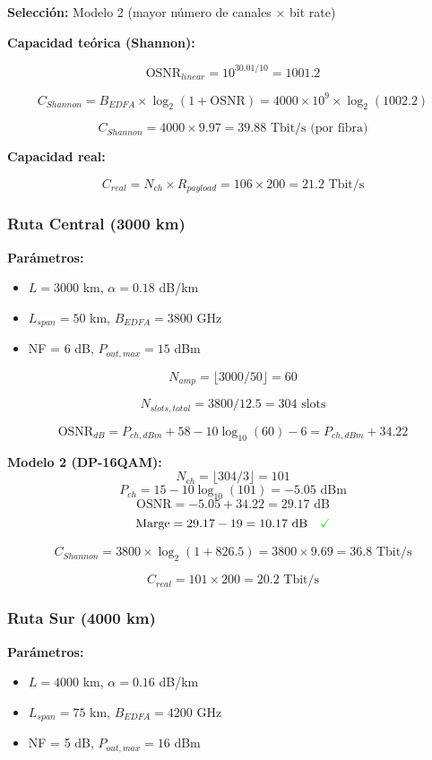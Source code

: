 \documentclass[12pt,a4paper]{extarticle}
\begin{document}
\textbf{Selección:} Modelo 2 (mayor número de canales × bit rate)

\textbf{Capacidad teórica (Shannon):}

$$\text{OSNR}_{linear} = 10^{30.01/10} = 1001.2$$

$$C_{Shannon} = B_{EDFA} \times \log_2(1 + \text{OSNR}) = 4000 \times 10^9 \times \log_2(1002.2)$$

$$C_{Shannon} = 4000 \times 9.97 = 39.88 \text{ Tbit/s (por fibra)}$$

\textbf{Capacidad real:}

$$C_{real} = N_{ch} \times R_{payload} = 106 \times 200 = 21.2 \text{ Tbit/s}$$

\subsubsection*{Ruta Central (3000 km)}

\textbf{Parámetros:}
\begin{itemize}
    \item $L = 3000$ km, $\alpha = 0.18$ dB/km
    \item $L_{span} = 50$ km, $B_{EDFA} = 3800$ GHz
    \item NF = 6 dB, $P_{out,max} = 15$ dBm
\end{itemize}

$$N_{amp} = \lfloor 3000/50 \rfloor = 60$$

$$N_{slots,total} = 3800/12.5 = 304 \text{ slots}$$

$$\text{OSNR}_{dB} = P_{ch,dBm} + 58 - 10\log_{10}(60) - 6 = P_{ch,dBm} + 34.22$$

\textbf{Modelo 2 (DP-16QAM):}
$$N_{ch} = \lfloor 304/3 \rfloor = 101$$
$$P_{ch} = 15 - 10\log_{10}(101) = -5.05 \text{ dBm}$$
$$\text{OSNR} = -5.05 + 34.22 = 29.17 \text{ dB}$$
$$\text{Marge} = 29.17 - 19 = 10.17 \text{ dB} \quad \textcolor{green}{\checkmark}$$

$$C_{Shannon} = 3800 \times \log_2(1 + 826.5) = 3800 \times 9.69 = 36.8 \text{ Tbit/s}$$

$$C_{real} = 101 \times 200 = 20.2 \text{ Tbit/s}$$

\subsubsection*{Ruta Sur (4000 km)}

\textbf{Parámetros:}
\begin{itemize}
    \item $L = 4000$ km, $\alpha = 0.16$ dB/km
    \item $L_{span} = 75$ km, $B_{EDFA} = 4200$ GHz
    \item NF = 5 dB, $P_{out,max} = 16$ dBm
\end{itemize}
\end{document}
